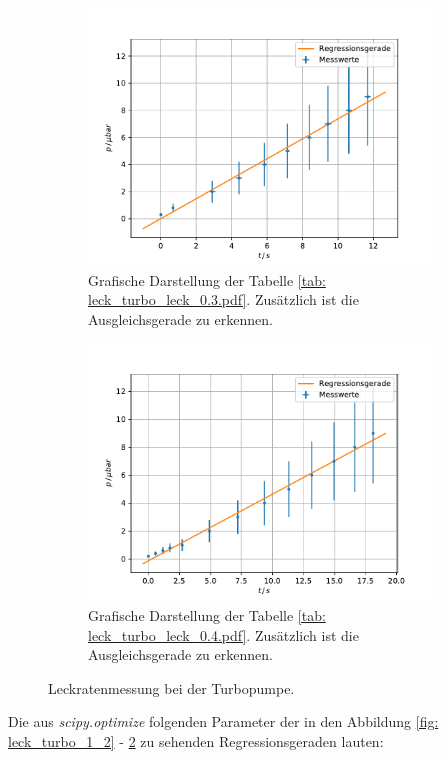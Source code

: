 \begin{figure}[h]
    \centering
    \begin{subfigure}{0.4\textwidth}
        \centering
        \includegraphics[width=1\textwidth]{../Messdaten/plots/turbo/leckrate_turbo_03.pdf}
        \caption{Grafische Darstellung der Tabelle \ref{tab: leck_turbo_leck_0.3.pdf}. Zusätzlich ist die Ausgleichsgerade zu erkennen.}
        \label{fig: turbo_leck_1_2}
    \end{subfigure}
    \begin{subfigure}{0.4\textwidth}
        \centering
        \includegraphics[width=1\textwidth]{../Messdaten/plots/turbo/leckrate_turbo_04.pdf}
        \caption{Grafische Darstellung der Tabelle \ref{tab: leck_turbo_leck_0.4.pdf}. Zusätzlich ist die Ausgleichsgerade zu erkennen.}
    \end{subfigure}
    \caption{Leckratenmessung bei der Turbopumpe.}
      \label{fig: leck_turbo_2_2}
\end{figure}
Die aus \emph{scipy.optimize} folgenden Parameter der in den Abbildung \ref{fig: leck_turbo_1_2} - \ref{fig: leck_turbo_2_2} zu sehenden Regressionsgeraden lauten:

